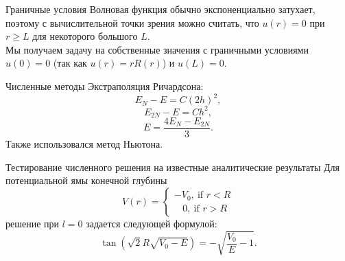 \documentclass{beamer}
\begin{document}
\begin{frame}{Граничные условия}
	 Волновая функция обычно экспоненциально затухает, поэтому с вычислительной точки зрения можно считать, что $u (r) = 0$ при $ r \geq L$ для некоторого большого $L$.\\
	Мы получаем задачу на собственные значения с граничными условиями $u (0) = 0$ (так как $u (r) = r R (r)$) и $u (L) = 0$.
\end{frame}


\begin{frame}{Численные методы}
Экстраполяция Ричардсона: \vskip 2mm
$$E_{N} - E = C (2h)^2,$$
$$E_{2N} - E = C h^2,$$
\vskip 2mm
 $$E = \frac{4 E_N - E_{2N}}{3}.$$
 \vskip 2mm
 Также использовался метод Ньютона.
  
\end{frame}

\begin{frame}{Тестирование численного решения на известные аналитические результаты}
  Для потенциальной ямы конечной глубины $$V(r)=\begin{cases}
-V_0, ~\text{if } r< R\\
~~~~0, ~\text{if } r>R
\end{cases}$$
решение при $l = 0$ задается следующей формулой: 
$$\tan(\sqrt{2} R \sqrt{V_0-E})=-\sqrt{\frac{V_0}{E}-1}.$$ 
\end{frame}
\end{document}

